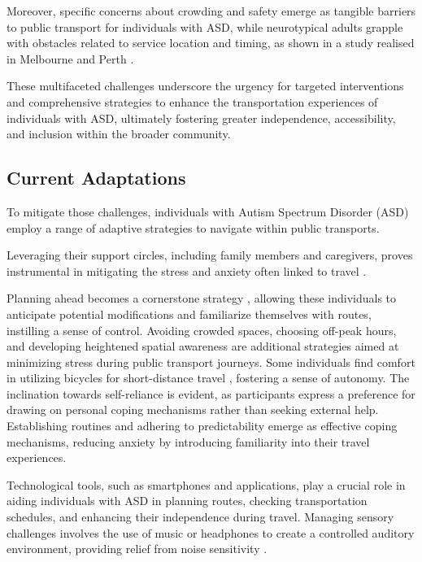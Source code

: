     Moreover, specific concerns about crowding and safety emerge as tangible barriers to public transport for individuals with ASD, while neurotypical adults grapple with obstacles related to service location and timing, as shown in a study realised in Melbourne and Perth \cite{falkmer_viewpoints_2015}. 
    
    These multifaceted challenges underscore the urgency for targeted interventions and comprehensive strategies to enhance the transportation experiences of individuals with ASD, ultimately fostering greater independence, accessibility, and inclusion within the broader community.

\subsection{Current Adaptations}

   To mitigate those challenges, individuals with Autism Spectrum Disorder (ASD) employ a range of adaptive strategies to navigate within public transports. 
   
   Leveraging their support circles, including family members and caregivers, proves instrumental in mitigating the stress and anxiety often linked to travel \cite{deka_co-principal_nodate}. 
   
   Planning ahead becomes a cornerstone strategy \cite{haas_experiences_nodate}, allowing these individuals to anticipate potential modifications and familiarize themselves with routes, instilling a sense of control.
   Avoiding crowded spaces, choosing off-peak hours, and developing heightened spatial awareness are additional strategies aimed at minimizing stress during public transport journeys.
   Some individuals find comfort in utilizing bicycles for short-distance travel \cite{falkmer_viewpoints_2015}, fostering a sense of autonomy. The inclination towards self-reliance is evident, as participants express a preference for drawing on personal coping mechanisms rather than seeking external help. Establishing routines and adhering to predictability emerge as effective coping mechanisms, reducing anxiety by introducing familiarity into their travel experiences. 
   
   Technological tools, such as smartphones and applications, play a crucial role in aiding individuals with ASD in planning routes, checking transportation schedules, and enhancing their independence during travel. 
   Managing sensory challenges involves the use of music or headphones to create a controlled auditory environment, providing relief from noise sensitivity \cite{haas_experiences_nodate}. 
   
